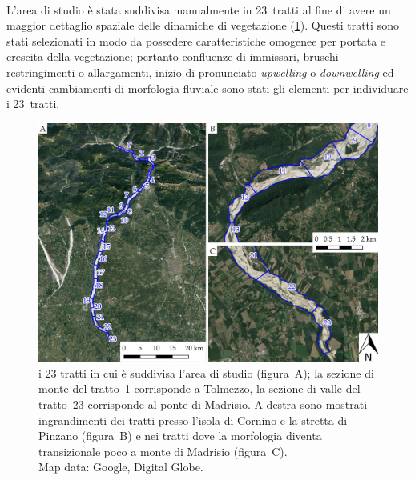 %
\\
L'area di studio è stata suddivisa manualmente in 23~tratti al fine di avere un maggior dettaglio spaziale delle dinamiche di vegetazione (\cref{fig:23-tratti}). 
Questi tratti sono stati selezionati in modo da possedere caratteristiche omogenee per portata e crescita della vegetazione; 
pertanto confluenze di immissari, bruschi restringimenti o allargamenti, inizio di pronunciato \emph{upwelling} o \emph{downwelling} ed evidenti cambiamenti di morfologia fluviale sono stati gli elementi per individuare i 23~tratti.
%
\begin{figure}
	\centering
	\includegraphics[width=\textwidth]{files/tutti_23_tratti.jpeg}
	\caption[i 23 tratti in cui è suddivisa l'area di studio]{i 23 tratti in cui è suddivisa l'area di studio (figura~A); la sezione di monte del tratto~1 corrisponde a Tolmezzo, la sezione di valle del tratto~23 corrisponde al ponte di Madrisio. A destra sono mostrati ingrandimenti dei tratti presso l'isola di Cornino e la stretta di Pinzano (figura~B) e nei tratti dove la morfologia diventa transizionale poco a monte di Madrisio (figura~C).
	\\
	Map data: Google, Digital Globe.}
	\label{fig:23-tratti}
\end{figure}


